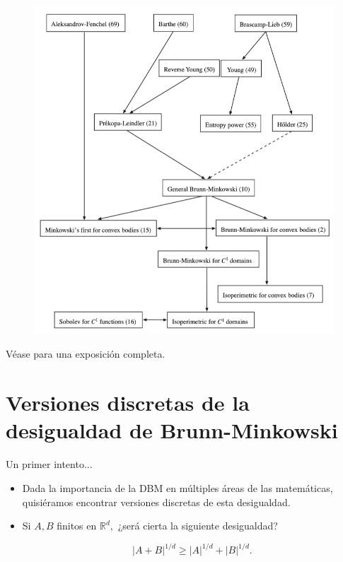 \documentclass{beamer}
\newcommand\blfootnote[1]{%
  \begingroup
  \renewcommand\thefootnote{}\footnote{#1}%
  \addtocounter{footnote}{-1}%
  \endgroup
}
\begin{document}
\begin{frame}{}
    \begin{figure}
        \centering
        \includegraphics[scale=0.30]{pics/BM-arbol.png}
    \end{figure}
    Véase \cite{Gardner2002TheBI} para una exposición completa.
\end{frame}


\section{Versiones discretas de la desigualdad de Brunn-Minkowski}
\begin{frame}{Un primer intento...}
\begin{itemize}[<+->]
    \item Dada la importancia de la DBM en múltiples áreas de las matemáticas, quisiéramos encontrar versiones discretas de esta desigualdad.
    \item Si $A, B$ finitos en $\mathbb{R}^d,$ ¿será cierta la siguiente desigualdad?

    $$\lvert A + B\rvert^{1/d} \geq \lvert A \rvert^{1/d} + \lvert B \rvert^{1/d}. $$
\end{itemize}
    
\end{frame}
\end{document}
